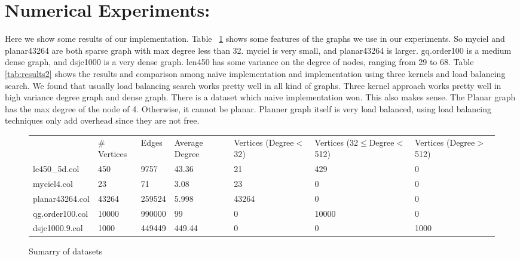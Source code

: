 \documentclass[12pt] {article}
\begin{document}
\section*{Numerical Experiments:}
Here we show some results of our implementation. Table ~\ref{tab:results1} shows some features of the graphs we use in our experiments. So myciel and planar43264 are both sparse graph with max degree less than 32. myciel is very small, and planar43264 is larger. gq.order100 is a medium dense graph, and dsjc1000 is a very dense graph. len450 has some variance on the degree of nodes, ranging from 29 to 68. Table ~ \ref{tab:results2} shows the results and comparison among naive implementation and implementation using three kernels and load balancing search. We found that usually load balancing search works pretty well in all kind of graphs. Three kernel approach works pretty well in high variance degree graph and dense graph. There is a dataset which naive implementation won. This also makes sense. The Planar graph has the max degree of the node of 4. Otherwise, it cannot be planar. Planner graph itself is very load balanced, using load balancing techniques only add overhead since they are not free. 

\begin{figure}[tbh]
 \centering    
\begin{tabular}{ |p{2.9cm}||p{1.7cm}| p{1.7cm}|p{1.7cm}|p{2.2cm}|p{3cm}|p{2.4cm}|}
 \hline
   & $\#$Vertices & Edges &  Average Degree & Vertices (Degree$<$32) & Vertices (32$\leq$Degree$<$512) &Vertices (Degree$>$512) \\ 
     
     \hhline{|=||=|=|=|=|=|=|}
 \hline
 le450\_5d.col &450       & 9757  & 43.36 &21  &429 & 0\\
 \hline
 myciel4.col &  23       & 71  &3.08  &23  &0  &0\\
 \hline
   planar43264.col & 43264     &  259524 & 5.998  &43264 & 0 &0 \\
 \hline
   qg.order100.col &10000  &990000  & 99  & 0 & 10000 & 0 \\
 \hline
   dsjc1000.9.col & 1000  & 449449 & 449.44  & 0 & 0 & 1000 \\
 \hline
 \hline
 
 
\end{tabular} 
\caption{Sumarry of datasets}
   \label{tab:results1}
\end{figure} 
\end{document}
